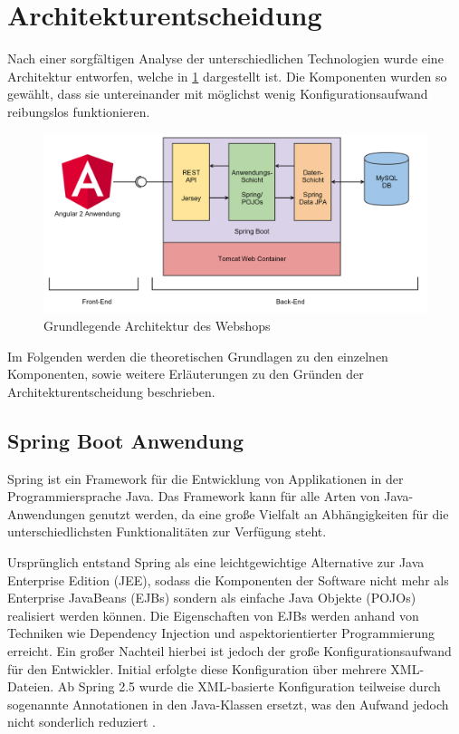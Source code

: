\section{Architekturentscheidung}\label{arch_decission} \thispagestyle{nomarkstyle}
Nach einer sorgfältigen Analyse der unterschiedlichen Technologien wurde eine Architektur entworfen, welche in \cref{fig:webshop_arch} dargestellt ist. Die Komponenten wurden so gewählt, dass sie untereinander mit möglichst wenig Konfigurationsaufwand reibungslos funktionieren.

\begin{figure}[th!]
	\centering
	\includegraphics[width=\linewidth]{bilder/kap5/webshop_arch.png}
	\caption{Grundlegende Architektur des Webshops}
	\label{fig:webshop_arch}
\end{figure}

Im Folgenden werden die theoretischen Grundlagen zu den einzelnen Komponenten, sowie weitere Erläuterungen zu den Gründen der Architekturentscheidung beschrieben.

\subsection{Spring Boot Anwendung}
Spring ist ein Framework für die Entwicklung von Applikationen in der Programmiersprache Java.
Das Framework kann für alle Arten von Java-Anwendungen genutzt werden, da eine große Vielfalt an Abhängigkeiten für die unterschiedlichsten Funktionalitäten zur Verfügung steht.

Ursprünglich entstand Spring als eine leichtgewichtige Alternative zur Java Enterprise Edition (\acs{JEE}), sodass die Komponenten der Software nicht mehr als Enterprise JavaBeans (\acs{EJB}s) sondern als einfache Java Objekte (\acs{POJO}s) realisiert werden können.
Die Eigenschaften von \acs{EJB}s werden anhand von Techniken wie Dependency Injection und aspektorientierter Programmierung erreicht.
Ein großer Nachteil hierbei ist jedoch der große Konfigurationsaufwand für den Entwickler.
Initial erfolgte diese Konfiguration über mehrere \acs{XML}-Dateien. Ab Spring 2.5 wurde die \acs{XML}-basierte Konfiguration teilweise durch sogenannte Annotationen in den Java-Klassen ersetzt, was den Aufwand jedoch nicht sonderlich reduziert \cite{Walls2015}.

